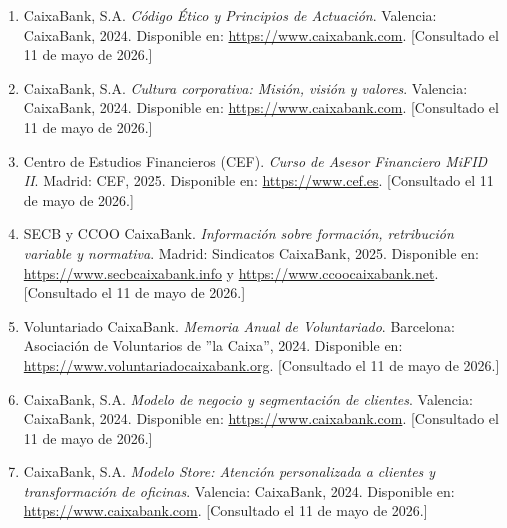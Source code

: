 \begin{enumerate}
  \item \label{ref:cx_codigo_etico}
    CaixaBank, S.A.
    \textit{Código Ético y Principios de Actuación}.
    Valencia: CaixaBank, 2024.
    Disponible en: \url{https://www.caixabank.com}.
    [Consultado el 11 de mayo de 2026.]

  \item \label{ref:cx_cultura}
    CaixaBank, S.A.
    \textit{Cultura corporativa: Misión, visión y valores}.
    Valencia: CaixaBank, 2024.
    Disponible en: \url{https://www.caixabank.com}.
    [Consultado el 11 de mayo de 2026.]



  \item \label{ref:cef_mifid}
    Centro de Estudios Financieros (CEF).
    \textit{Curso de Asesor Financiero MiFID II}.
    Madrid: CEF, 2025.
    Disponible en: \url{https://www.cef.es}.
    [Consultado el 11 de mayo de 2026.]

  \item \label{ref:sindicatos_cx}
    SECB y CCOO CaixaBank.
    \textit{Información sobre formación, retribución variable y normativa}.
    Madrid: Sindicatos CaixaBank, 2025.
    Disponible en: \url{https://www.secbcaixabank.info} y \url{https://www.ccoocaixabank.net}.
    [Consultado el 11 de mayo de 2026.]

  \item \label{ref:cx_voluntariado}
    Voluntariado CaixaBank.
    \textit{Memoria Anual de Voluntariado}.
    Barcelona: Asociación de Voluntarios de ”la Caixa”, 2024.
    Disponible en: \url{https://www.voluntariadocaixabank.org}.
    [Consultado el 11 de mayo de 2026.]

  \item \label{ref:cx_modelo}
    CaixaBank, S.A.
    \textit{Modelo de negocio y segmentación de clientes}.
    Valencia: CaixaBank, 2024.
    Disponible en: \url{https://www.caixabank.com}.
    [Consultado el 11 de mayo de 2026.]

  \item \label{ref:cx_store}
    CaixaBank, S.A.
    \textit{Modelo Store: Atención personalizada a clientes y transformación de oficinas}.
    Valencia: CaixaBank, 2024.
    Disponible en: \url{https://www.caixabank.com}.
    [Consultado el 11 de mayo de 2026.]

\end{enumerate}


